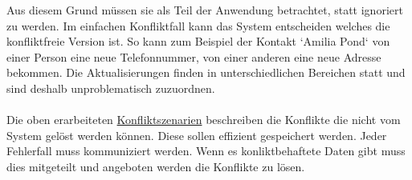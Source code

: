 Aus diesem Grund müssen sie als Teil der Anwendung betrachtet, statt ignoriert zu werden.
Im einfachen Konfliktfall kann das System entscheiden welches die konfliktfreie Version ist.
So kann zum Beispiel der Kontakt `Amilia Pond` von einer Person eine neue Telefonnummer, von einer anderen eine neue Adresse bekommen.
Die Aktualisierungen finden in unterschiedlichen Bereichen statt und sind deshalb unproblematisch zuzuordnen.\\\\
Die oben erarbeiteten \hyperref[chap:konfliktszenarien]{Konfliktszenarien} beschreiben die Konflikte die nicht vom System gelöst werden können.
Diese sollen effizient gespeichert werden.
Jeder Fehlerfall muss kommuniziert werden. Wenn es konliktbehaftete Daten gibt muss dies mitgeteilt und angeboten werden die Konflikte zu lösen.

